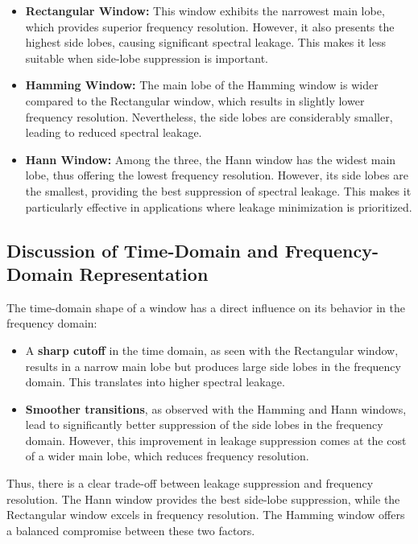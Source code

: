 \documentclass[10pt]{article}
\theoremstyle{definition}
\theoremstyle{remark}
\theoremstyle{definition}
\numberwithin{equation}{prob}
\begin{document}
\begin{itemize}
    \item \textbf{Rectangular Window:} This window exhibits the narrowest main lobe, which provides superior frequency resolution. However, it also presents the highest side lobes, causing significant spectral leakage. This makes it less suitable when side-lobe suppression is important.
    
    \item \textbf{Hamming Window:} The main lobe of the Hamming window is wider compared to the Rectangular window, which results in slightly lower frequency resolution. Nevertheless, the side lobes are considerably smaller, leading to reduced spectral leakage.
    
    \item \textbf{Hann Window:} Among the three, the Hann window has the widest main lobe, thus offering the lowest frequency resolution. However, its side lobes are the smallest, providing the best suppression of spectral leakage. This makes it particularly effective in applications where leakage minimization is prioritized.
\end{itemize}

\subsection{Discussion of Time-Domain and Frequency-Domain Representation}
The time-domain shape of a window has a direct influence on its behavior in the frequency domain:

\begin{itemize}
    \item A \textbf{sharp cutoff} in the time domain, as seen with the Rectangular window, results in a narrow main lobe but produces large side lobes in the frequency domain. This translates into higher spectral leakage.

    \item \textbf{Smoother transitions}, as observed with the Hamming and Hann windows, lead to significantly better suppression of the side lobes in the frequency domain. However, this improvement in leakage suppression comes at the cost of a wider main lobe, which reduces frequency resolution.
\end{itemize}

Thus, there is a clear trade-off between leakage suppression and frequency resolution. The Hann window provides the best side-lobe suppression, while the Rectangular window excels in frequency resolution. The Hamming window offers a balanced compromise between these two factors.
\end{document}
